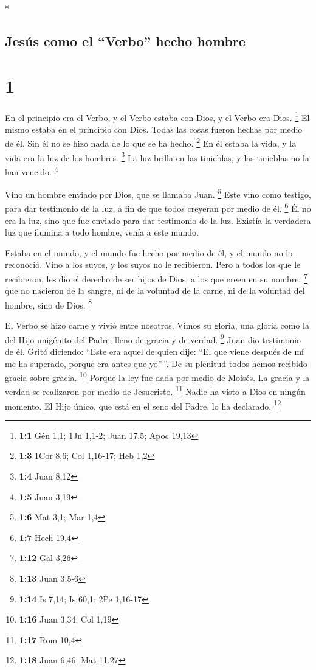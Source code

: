 \begin{paracol}{2} \switchcolumn[0]*

\hypertarget{jesuxfas-como-el-verbo-hecho-hombre}{%
\subsection{Jesús como el ``Verbo'' hecho
hombre}\label{jesuxfas-como-el-verbo-hecho-hombre}}

\hypertarget{section}{%
\section{1}\label{section}}

 En el principio era el Verbo, y el Verbo estaba con Dios,
y el Verbo era Dios. \footnote{\textbf{1:1} Gén 1,1; 1Jn 1,1-2; Juan
  17,5; Apoc 19,13}  El mismo estaba en el principio con
Dios.  Todas las cosas fueron hechas por medio de él. Sin
él no se hizo nada de lo que se ha hecho. \footnote{\textbf{1:3} 1Cor
  8,6; Col 1,16-17; Heb 1,2}  En él estaba la vida, y la
vida era la luz de los hombres. \footnote{\textbf{1:4} Juan 8,12}
 La luz brilla en las tinieblas, y las tinieblas no la han
vencido. \footnote{\textbf{1:5} Juan 3,19}

 Vino un hombre enviado por Dios, que se llamaba Juan.
\footnote{\textbf{1:6} Mat 3,1; Mar 1,4}  Este vino como
testigo, para dar testimonio de la luz, a fin de que todos creyeran por
medio de él. \footnote{\textbf{1:7} Hech 19,4}  Él no era
la luz, sino que fue enviado para dar testimonio de la luz.
 Existía la verdadera luz que ilumina a todo hombre, venía
a este mundo.

 Estaba en el mundo, y el mundo fue hecho por medio de
él, y el mundo no lo reconoció.  Vino a los suyos, y los
suyos no le recibieron.  Pero a todos los que le
recibieron, les dio el derecho de ser hijos de Dios, a los que creen en
su nombre: \footnote{\textbf{1:12} Gal 3,26}  que no
nacieron de la sangre, ni de la voluntad de la carne, ni de la voluntad
del hombre, sino de Dios. \footnote{\textbf{1:13} Juan 3,5-6}

 El Verbo se hizo carne y vivió entre nosotros. Vimos su
gloria, una gloria como la del Hijo unigénito del Padre, lleno de gracia
y de verdad. \footnote{\textbf{1:14} Is 7,14; Is 60,1; 2Pe 1,16-17}
 Juan dio testimonio de él. Gritó diciendo: ``Este era
aquel de quien dije: ``El que viene después de mí me ha superado, porque
era antes que yo''\,''.  De su plenitud todos hemos
recibido gracia sobre gracia. \footnote{\textbf{1:16} Juan 3,34; Col
  1,19}  Porque la ley fue dada por medio de Moisés. La
gracia y la verdad se realizaron por medio de Jesucristo. \footnote{\textbf{1:17}
  Rom 10,4}  Nadie ha visto a Dios en ningún momento. El
Hijo único, que está en el seno del Padre, lo ha declarado. \footnote{\textbf{1:18}
  Juan 6,46; Mat 11,27}


\end{paracol}
